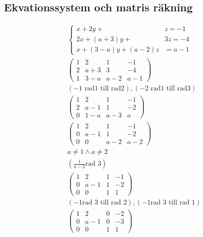 \begin{multicols}{2}
\subsection{Ekvationssystem och matris räkning}
\begin{align*}
  &\quad \left\{\begin{array}{rr}
  x+2 y+ & z=-1 \\
  2 x+(a+3) y+ & 3 z=-4 \\
  x+(3-a) y+(a-2) z & =a-1
  \end{array}\right. \\
  &\quad \left(\begin{array}{ccc|c}
    1 & 2 & 1 & -1 \\
    2 & a+3 & 3 & -4 \\
    1 & 3-a & a-2 & a-1
  \end{array}\right) \\
  &\quad (-1 \text{ rad1 till rad2}), (-2 \text{ rad1 till rad3}) \\
  &\quad \left(\begin{array}{ccc|c}
    1 & 2 & 1 & -1 \\
    2 & a-1 & 1 & -2 \\
    0 & 1-a & a-3 & a
  \end{array}\right) \\
  &\quad \left(\begin{array}{ccc|c}
    1 & 2 & 1 & -1 \\
    0 & a-1 & 1 & -2 \\
    0 & 0 & a-2 & a-2
  \end{array}\right) \\
  &\quad a \neq 1 \land a \neq 2 \\
  &\quad (\frac{1}{a-2} \text{rad 3}) \\
  &\quad \left(\begin{array}{ccc|c}
    1 & 2 & 1 & -1 \\
    0 & a-1 & 1 & -2 \\
    0 & 0 & 1 & 1
  \end{array}\right) \\
  &\quad (-1 \text{rad 3 till rad 2}), (-1 \text{rad 3 till rad 1}) \\
  &\quad \left(\begin{array}{ccc|c}
    1 & 2 & 0 & -2 \\
    0 & a-1 & 0 & -3 \\
    0 & 0 & 1 & 1
  \end{array}\right) \\

\end{align*}
\end{multicols}
